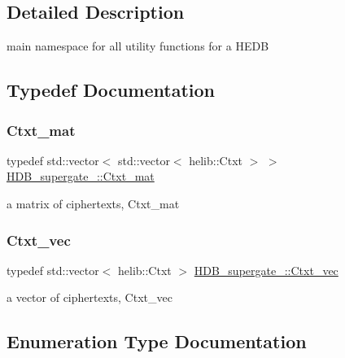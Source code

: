 \subsection{Detailed Description}
main namespace for all utility functions for a H\+E\+DB 

\subsection{Typedef Documentation}
\mbox{\label{namespaceHDB__supergate___a46a3fb2b98c95dc7615203376c4ad0c8}} 
\subsubsection{\texorpdfstring{Ctxt\+\_\+mat}{Ctxt\_mat}}
{\footnotesize\ttfamily typedef std\+::vector$<$ std\+::vector$<$ helib\+::\+Ctxt $>$ $>$ \hyperlink{namespaceHDB__supergate___a46a3fb2b98c95dc7615203376c4ad0c8}{H\+D\+B\+\_\+supergate\+\_\+\+::\+Ctxt\+\_\+mat}}

a matrix of ciphertexts, Ctxt\+\_\+mat \mbox{\label{namespaceHDB__supergate___ade0781b5973aae08b689ed72b30511fb}} 
\subsubsection{\texorpdfstring{Ctxt\+\_\+vec}{Ctxt\_vec}}
{\footnotesize\ttfamily typedef std\+::vector$<$ helib\+::\+Ctxt $>$ \hyperlink{namespaceHDB__supergate___ade0781b5973aae08b689ed72b30511fb}{H\+D\+B\+\_\+supergate\+\_\+\+::\+Ctxt\+\_\+vec}}

a vector of ciphertexts, Ctxt\+\_\+vec 

\subsection{Enumeration Type Documentation}
\mbox{\label{namespaceHDB__supergate___a1d92aed09c83a1692f702cbaa85757e2}} 
